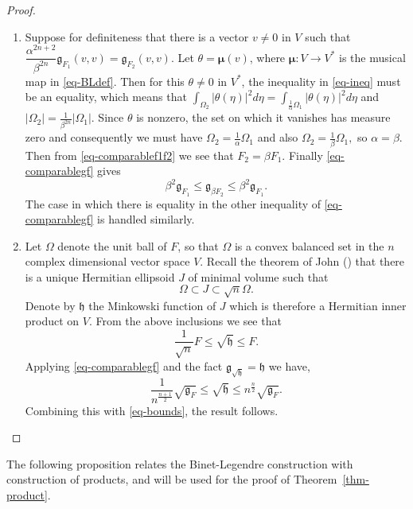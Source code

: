 \documentclass[a4paper,11pt,reqno]{amsart}
\theoremstyle{plain}
\theoremstyle{definition}
\theoremstyle{remark}
\theoremstyle{remark}
\numberwithin{equation}{section}
\newcommand{\abs}[1]{\left\vert#1\right\vert}
\newcommand{\miso}{\bm{\mu}}
\newcommand{\g}{\mathfrak{g}}
\begin{document}
\begin{proof}
\begin{enumerate}[wide]
\item Suppose for definiteness that there is a vector $v\not=0$ in $V$ such that 
$\dfrac{\alpha^{2n+2}}{\beta^{2n}} \g_{F_1}(v,v) = \g_{F_2}(v,v).$ Let $\theta=\miso(v)$,
where $\miso:V\to V^*$ is the musical map in \eqref{eq-BLdef}. Then for this $\theta\not=0$ in $V^*$,
the inequality in \eqref{eq-ineq} must be an equality, which means that ${\int_{\Omega_2}\abs{\theta(\eta)}^2d\eta}= {\int_{\frac{1}{\alpha}\Omega_1}\abs{\theta(\eta)}^2d\eta }$ 
and ${\abs{\Omega_2}}= {\frac{1}{\beta^{2n}}\abs{\Omega_1}}$. Since $\theta$ is nonzero, the set 
on which it vanishes has measure zero and consequently we must have  $\Omega_2=\frac{1}{\alpha}\Omega_1$ and also $\Omega_2=\frac{1}{\beta}\Omega_1,$ so $\alpha=\beta$. Then from  \eqref{eq-comparablef1f2}  we see that $F_2=\beta F_1.$ Finally \eqref{eq-comparablegf} gives
\[ \beta^2 \g_{F_1} \leq \g_{\beta F_2} \leq \beta^2 \g_{F_1}.\]
The case in which there is equality in the other inequality of \eqref{eq-comparablegf} is handled similarly.
\item Let $\Omega$ denote the unit ball of $F$, so that 
$\Omega$ is a convex balanced set in the $n$ complex dimensional vector space $V$.
Recall the theorem of John (\cite{john,ball}) that there is a unique Hermitian ellipsoid $J$ of minimal volume such that 
\[ \Omega \subset J \subset \sqrt{n} \Omega.\]
Denote by $\mathfrak{h}$ the Minkowski function of $J$ which is therefore a Hermitian inner product on $V$. From the above inclusions we see that 
\begin{equation}
    \label{eq-bounds}
    \frac{1}{\sqrt{n}}F \leq \sqrt{\mathfrak{h}} \leq F.
\end{equation}
Applying \eqref{eq-comparablegf} and the fact $\g_{\sqrt{\mathfrak{h}}}={\mathfrak{h}}$ we have,\[
\frac{1}{n^{\frac{n+1}{2}}} \sqrt{\g_F} \leq \sqrt{\mathfrak{h}} \leq {n^{\frac{n}{2}}} \sqrt{\g_F}.\]
Combining this with \eqref{eq-bounds}, the result follows. 
    \end{enumerate}

\end{proof}
The following proposition relates the Binet-Legendre construction with construction of products, and will be used for the proof of Theorem~\ref{thm-product}.
\end{document}
